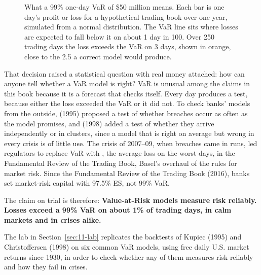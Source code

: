 \begin{figure}[htbp]
{%
}
\caption{What a 99\% one-day VaR of \$50 million means. Each bar is one day's profit or loss for a hypothetical trading book over one year, simulated from a normal distribution. The VaR line sits where losses are expected to fall below it on about 1 day in 100. Over 250 trading days the loss exceeds the VaR on 3 days, shown in orange, close to the 2.5 a correct model would produce.}
\label{fig:11-var-intro}
\end{figure}


That decision raised a statistical question with real money attached: how can anyone tell whether a VaR model is right? VaR is unusual among the claims in this book because it is a forecast that checks itself. Every day produces a test, because either the loss exceeded the VaR or it did not. To check banks' models from the outside,  (1995) proposed a test of whether breaches occur as often as the model promises, and  (1998) added a test of whether they arrive independently or in clusters, since a model that is right on average but wrong in every crisis is of little use. The crisis of 2007--09, when breaches came in runs, led regulators to replace VaR with , the average loss on the worst days, in the Fundamental Review of the Trading Book, Basel's overhaul of the rules for market risk.
Since the Fundamental Review of the Trading Book (2016), banks set market-risk capital with 97.5\% ES, not 99\% VaR. 


The claim on trial is therefore: \textbf{Value-at-Risk models measure risk reliably. Losses exceed a 99\% VaR on about 1\% of trading days, in calm markets and in crises alike.}

The lab in Section~\ref{sec:11-lab} replicates the backtests of Kupiec (1995) and Christoffersen (1998) on six common VaR models, using free daily U.S. market returns since 1930, in order to check whether any of them measures risk reliably and how they fail in crises.

